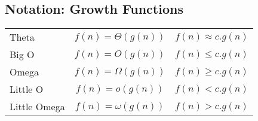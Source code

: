 \documentclass[11pt,a4paper]{report}
\renewcommand{\arraystretch}{2}
\begin{document}
			\subsection{Notation: Growth Functions}
					{\renewcommand{\arraystretch}{2}%
					\begin{tabular}{  l  c  r  }

					  	Theta 		& $ f(n) = \Theta(g(n)) $ 	& $ f(n) \approx c.g(n) $ \\

						Big O 		& $ f(n) = O(g(n)) $		& $f(n) \leq c.g(n)	 $ \\
						
						Omega		& $ f(n) = \Omega(g(n)) $ 	& $ f(n) \geq c.g(n) $ \\
						
						Little O		& $ f(n) = o(g(n)) $		& $ f(n) < c.g(n) $ \\
						
						Little Omega	& $ f(n) = \omega(g(n)) $	& $ f(n) > c.g(n) $ \\

					\end{tabular}}
\end{document}
